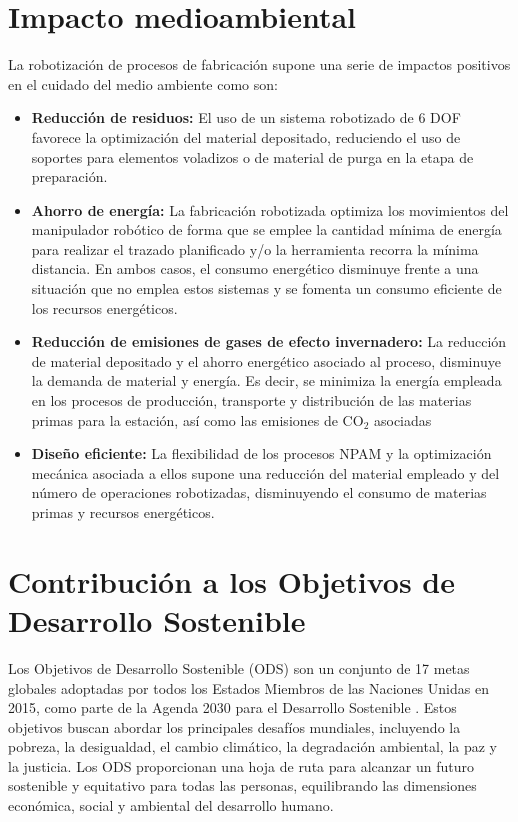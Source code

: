 \section{Impacto medioambiental}
La robotización de procesos de fabricación supone una serie de impactos positivos en el cuidado del medio ambiente como son:
\begin{itemize}
    \item \textbf{Reducción de residuos:} El uso de un sistema robotizado de 6 \acrshort{DOF} favorece la optimización del material depositado, reduciendo el uso de soportes para elementos voladizos o de material de purga en la etapa de preparación. 
    \item \textbf{Ahorro de energía:} La fabricación robotizada optimiza los movimientos del manipulador robótico de forma que se emplee la cantidad mínima de energía para realizar el trazado planificado y/o la herramienta recorra la mínima distancia. En ambos casos, el consumo energético disminuye frente a una situación que no emplea estos sistemas y se fomenta un consumo eficiente de los recursos energéticos.
    \item \textbf{Reducción de emisiones de gases de efecto invernadero:} La reducción de material depositado y el ahorro energético asociado al proceso, disminuye la demanda de material y energía. Es decir, se minimiza la energía empleada en los procesos de producción, transporte y distribución de las materias primas para la estación, así como las emisiones de CO$_2$ asociadas
    \item \textbf{Diseño eficiente:} La flexibilidad de los procesos \acrshort{NPAM} y la optimización mecánica asociada a ellos supone una reducción del material empleado y del número de operaciones robotizadas, disminuyendo el consumo de materias primas y recursos energéticos.
\end{itemize}

\section{Contribución a los Objetivos de Desarrollo Sostenible}
Los Objetivos de Desarrollo Sostenible (ODS) son un conjunto de 17 metas globales adoptadas por todos los Estados Miembros de las Naciones Unidas en 2015, como parte de la Agenda 2030 para el Desarrollo Sostenible \cite{web_ods}. Estos objetivos buscan abordar los principales desafíos mundiales, incluyendo la pobreza, la desigualdad, el cambio climático, la degradación ambiental, la paz y la justicia. Los ODS proporcionan una hoja de ruta para alcanzar un futuro sostenible y equitativo para todas las personas, equilibrando las dimensiones económica, social y ambiental del desarrollo humano.

